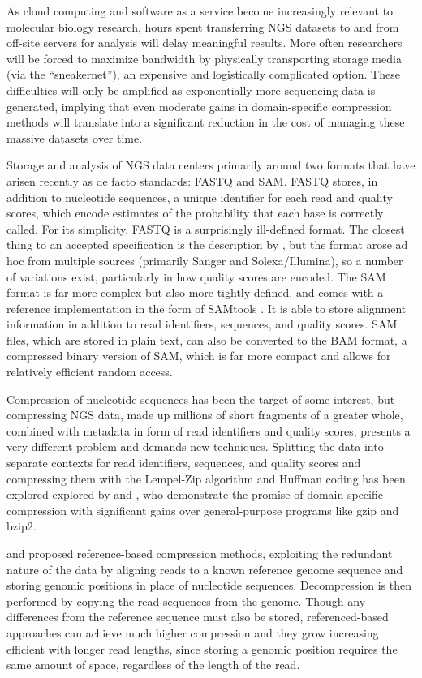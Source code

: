 \documentclass[a4,center,fleqn]{NAR}
\begin{document}
As cloud computing and software as a service become increasingly relevant to
molecular biology research, hours spent transferring NGS datasets to and from
off-site servers for analysis will delay meaningful results. More often
researchers will be forced to maximize bandwidth by physically transporting
storage media (via the ``sneakernet''), an expensive and logistically
complicated option. These difficulties will only be amplified as exponentially
more sequencing data is generated,  implying that even moderate gains in
domain-specific compression methods will translate into a significant
reduction in the cost of managing these massive datasets over time.

Storage and analysis of NGS data centers primarily around two formats that
have arisen recently as de facto standards: FASTQ and SAM. FASTQ stores, in
addition to nucleotide sequences, a unique identifier for each read and
quality scores, which encode estimates of the probability that each base is
correctly called. For its simplicity, FASTQ is a surprisingly ill-defined
format. The closest thing to an accepted specification is the description by
\citet{Cock2010}, but the format arose ad hoc from multiple sources (primarily
Sanger and Solexa/Illumina), so a number of variations exist, particularly in
how quality scores are encoded. The SAM format is far more complex but also
more tightly defined, and comes with a reference implementation in the form of
SAMtools \citep{Li2009b}. It is able to store alignment information in
addition to read identifiers, sequences, and quality scores. SAM files, which
are stored in plain text, can also be converted to the BAM format, a
compressed binary version of SAM, which is far more compact and allows for
relatively efficient random access.

Compression of nucleotide sequences has been the target of some interest, but
compressing NGS data, made up millions of short fragments of a greater whole,
combined with metadata in form of read identifiers and quality scores,
presents a very different problem and demands new techniques. Splitting the
data into separate contexts for read identifiers, sequences, and quality
scores and compressing them with the Lempel-Zip algorithm and Huffman coding
has been explored explored by \citet{Tembe2010} and \citet{Deorowicz2011}, who
demonstrate the promise of domain-specific compression with significant gains
over general-purpose programs like gzip and bzip2.

\citet{Kozanitis2011} and \citet{Hsi-YangFritz2011} proposed reference-based
compression methods, exploiting the redundant nature of the data by aligning
reads to a known reference genome sequence and storing genomic positions in
place of nucleotide sequences. Decompression is then performed by copying the
read sequences from the genome. Though any differences from the reference
sequence must also be stored, referenced-based approaches can achieve much
higher compression and they grow increasing efficient with longer read
lengths, since storing a genomic position requires the same amount of space,
regardless of the length of the read.
\end{document}
